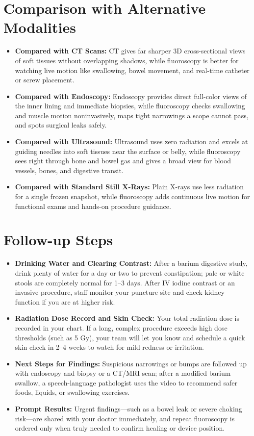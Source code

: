 \section{Comparison with Alternative Modalities}

\begin{itemize}
    \item \textbf{Compared with CT Scans:} CT gives far sharper 3D cross-sectional views of soft tissues without overlapping shadows, while fluoroscopy is better for watching live motion like swallowing, bowel movement, and real-time catheter or screw placement.
    \item \textbf{Compared with Endoscopy:} Endoscopy provides direct full-color views of the inner lining and immediate biopsies, while fluoroscopy checks swallowing and muscle motion noninvasively, maps tight narrowings a scope cannot pass, and spots surgical leaks safely.
    \item \textbf{Compared with Ultrasound:} Ultrasound uses zero radiation and excels at guiding needles into soft tissues near the surface or belly, while fluoroscopy sees right through bone and bowel gas and gives a broad view for blood vessels, bones, and digestive transit.
    \item \textbf{Compared with Standard Still X-Rays:} Plain X-rays use less radiation for a single frozen snapshot, while fluoroscopy adds continuous live motion for functional exams and hands-on procedure guidance.
\end{itemize}

\section{Follow-up Steps}

\begin{itemize}
    \item \textbf{Drinking Water and Clearing Contrast:} After a barium digestive study, drink plenty of water for a day or two to prevent constipation; pale or white stools are completely normal for 1--3 days. After IV iodine contrast or an invasive procedure, staff monitor your puncture site and check kidney function if you are at higher risk.
    \item \textbf{Radiation Dose Record and Skin Check:} Your total radiation dose is recorded in your chart. If a long, complex procedure exceeds high dose thresholds (such as 5 Gy), your team will let you know and schedule a quick skin check in 2--4 weeks to watch for mild redness or irritation.
    \item \textbf{Next Steps for Findings:} Suspicious narrowings or bumps are followed up with endoscopy and biopsy or a CT/MRI scan; after a modified barium swallow, a speech-language pathologist uses the video to recommend safer foods, liquids, or swallowing exercises.
    \item \textbf{Prompt Results:} Urgent findings---such as a bowel leak or severe choking risk---are shared with your doctor immediately, and repeat fluoroscopy is ordered only when truly needed to confirm healing or device position.
\end{itemize}


